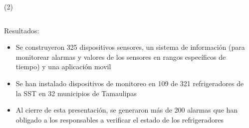 \begin{frame}{ (2)}
\begin{columns}
\begin{column}{0.8\textwidth}
Resultados:
\begin{itemize}
    \item Se construyeron 325 dispositivos sensores, un sistema de información (para monitorear alarmas y valores de los sensores en rangos específicos de tiempo) y una aplicación movil
    \item Se han instalado dispositivos de monitoreo en 109 de 321 refrigeradores de la SST en 32 municipios de Tamaulipas
    \item Al cierre de esta presentación, se generaron más de 200 alarmas que han obligado a los responsables a verificar el estado de los refrigeradores
	\end{itemize}
\end{column}
\begin{column}{0.2\textwidth}  
\begin{center}
     \begin{tabular}{c}

\end{tabular}
\end{center}
\end{column}
\end{columns}
\end{frame}
